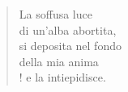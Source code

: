 
\begin{verse}
    La soffusa luce\\
    di un'alba abortita,\\
    si deposita nel fondo\\
    della mia anima\\!
    e la intiepidisce.
\end{verse}